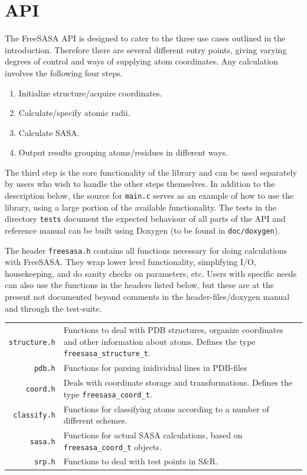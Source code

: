 \documentclass[a4paper,11pt]{article}
\begin{document}
\section{API} \label{sec:using}

The FreeSASA API is designed to cater to the three use cases outlined
in the introduction. Therefore there are several different entry
points, giving varying degrees of control and ways of supplying atom
coordinates. Any calculation involves the following four steps.
\begin{enumerate}
  \item Initialize structure/acquire coordinates.
  \item Calculate/specify atomic radii.
  \item Calculate SASA.
  \item Output results grouping atoms/residues in different ways.
\end{enumerate}
The third step is the core functionality of the library and can be
used separately by users who wish to handle the other steps
themselves. In addition to the description below, the source for
\texttt{main.c} serves as an example of how to use the library, using
a large portion of the available functionality. The tests in the
directory \verb|tests| document the expected behaviour of all parts of
the API and reference manual can be built using Doxygen (to be found
in \verb|doc/doxygen|).

The header \texttt{freesasa.h} contains all functions necessary for
doing calculations with FreeSASA. They wrap lower level functionality,
simplifying I/O, housekeeping, and do sanity checks on parameters,
etc. Users with specific needs can also use the functions in the
headers listed below, but these are at the present not documented
beyond comments in the header-files/doxygen manual and through the
test-suite.

\begin{tabular}{r>{\raggedright\arraybackslash}p{}}
\texttt{structure.h} & Functions to deal with PDB structures,  
                       organize coordinates and other information
                       about atoms. Defines the type 
                       \verb|freesasa_structure_t|.\\
\texttt{pdb.h} & Functions for parsing inidividual lines in PDB-files \\
\texttt{coord.h} & Deals with coordinate storage and transformations. Defines
                   the type \verb|freesasa_coord_t|.\\
\texttt{classify.h} & Functions for classifying atoms according
                      to a number of different schemes.\\
\texttt{sasa.h} & Functions for actual SASA calculations, based on
                  \verb|freesasa_coord_t| objects.\\
\texttt{srp.h} & Functions to deal with test points in S\&R. \\
\end{tabular}
\end{document}
